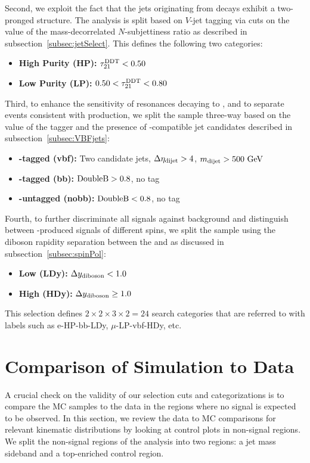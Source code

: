 Second, we exploit the fact that the jets originating from \VorH decays exhibit a two-pronged structure.
The analysis is split based on $V$-jet tagging via cuts on the value of the mass-decorrelated $N$-subjettiness ratio \nsubjDDT as described in subsection~\ref{subsec:jetSelect}.
This defines the following two categories:
\begin{itemize}
  \item {\bfseries High Purity (HP):} $\nsubjDDT<0.50$
  \item {\bfseries Low Purity (LP):} $0.50<\nsubjDDT<0.80$
\end{itemize}

Third, to enhance the sensitivity of resonances decaying to \WHtolnubbbar, and to separate events consistent with \VBF production, we split the sample three-way based on the value of the \DoubleB tagger and the presence of \VBF-compatible jet candidates described in subsection~\ref{subsec:VBFjets}:
\begin{itemize}
  \item {\bfseries \VBF-tagged (vbf):} Two candidate \VBF jets, $\DetaVBF>4$, $\mjjVBF>500\unit{GeV}$
  \item {\bfseries \bbbar-tagged (bb):} $\DoubleB>0.8$, no \VBF tag
  \item {\bfseries \bbbar-untagged (nobb):} $\DoubleB<0.8$, no \VBF tag
\end{itemize}

Fourth, to further discriminate all signals against background and distinguish between \VBF-produced signals of different spins, we split the sample using the diboson rapidity separation \Dy between the \Wlep and \Vhad as discussed in subsection~\ref{subsec:spinPol}:
\begin{itemize}
  \item {\bfseries Low \Dy (LDy):} $\Dy<1.0$
  \item {\bfseries High \Dy (HDy):} $\Dy\geq1.0$
\end{itemize}

This selection defines $2\times2\times3\times2=24$ search categories that are referred to with labels such as e-HP-bb-LDy, $\mu$-LP-vbf-HDy, etc.

\section{Comparison of Simulation to Data}
\label{sec:comp}

A crucial check on the validity of our selection cuts and categorizations is to compare the MC samples to the data in the regions where no signal is expected to be observed.
In this section, we review the data to MC comparisons for relevant kinematic distributions by looking at control plots in non-signal regions.
We split the non-signal regions of the analysis into two regions: a jet mass sideband and a top-enriched control region.

